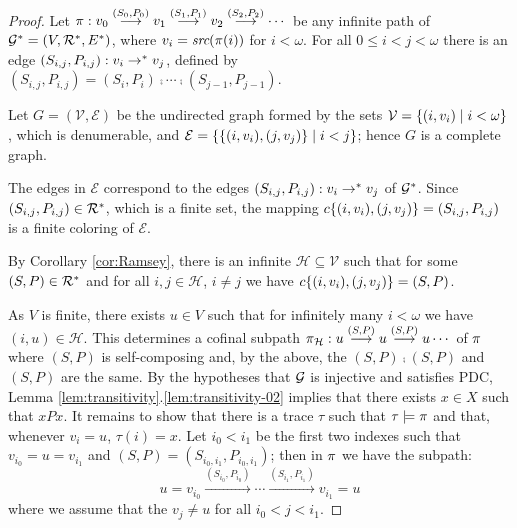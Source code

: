 \begin{proof}
Let $\pi : v_0 \stackrel{(S_0,P_0)}{\longrightarrow} v_1 \stackrel{(S_1,P_1)}{\longrightarrow} v_2 \stackrel{(S_2,P_2)}{\longrightarrow}\cdots$
be any infinite path of $\mathcal{G}^* = (V, \mathcal{R}^*, E^*)$, where $v_i = \textit{src}( \pi(i) )$ for $i < \omega$.
For all $0 \leq i < j < \omega$ there is an edge $(S_{i,j}, P_{i,j}) : v_i \to^* v_j$, 
defined by
$(S_{i,j}, P_{i,j}) = (S_{i}, P_{i}) \comp \cdots \comp (S_{j-1}, P_{j-1})$.

Let $G = (\mathcal{V}, \mathcal{E})$ be the undirected graph formed by the sets
$\mathcal{V} = \{ (i, v_i) \mid i < \omega \}$, which is denumerable, and $\mathcal{E} = \{ \{ (i, v_i), (j, v_j) \} \mid i < j \}$; hence $G$ is a complete graph.

The edges in $\mathcal{E}$ correspond
to the edges $(S_{i,j}, P_{i,j}) : v_i \to^* v_j$ of $\mathcal{G}^*$. 
Since $(S_{i,j}, P_{i,j}) \in \mathcal{R}^*$, which is a finite set, the mapping
$c\{ (i, v_i), (j, v_j) \} = (S_{i,j}, P_{i,j})$ is a finite coloring of $\mathcal{E}$.

By Corollary \ref{cor:Ramsey}, there is an infinite $\mathcal{H} \subseteq \mathcal{V}$ such that for some $(S, P) \in \mathcal{R}^*$ and for all $i, j \in \mathcal{H}$, $i \not  = j$ we have
$c\{ (i, v_i), (j, v_j) \} = (S, P)$. 

As $V$ is finite, there exists $u \in V$ such that for infinitely many $i < \omega$
we have $(i, u) \in \mathcal{H}$.
This determines a cofinal subpath $\pi_{\mathcal{H}} : u \stackrel{(S,P)}{\longrightarrow} u \stackrel{(S,P)}{\longrightarrow} u \cdots$ of $\pi$ where $(S,P)$ is self-composing and, by the above, the  $(S,P)\comp (S,P)$ and $ (S,P)$ are the same.
By the hypotheses that $\mathcal{G}$ is
injective and satisfies PDC, Lemma \ref{lem:transitivity}.\ref{lem:transitivity-02} 
implies that there exists $x \in X$ such that $x P x$.  
It remains to show that there is a trace $\tau$ such that $\tau \models \pi$ and that, whenever $v_i = u$, $\tau(i) = x$.
Let $i_0 < i_1$ be the first two indexes such that $v_{i_0} = u = v_{i_1}$ and $(S,P) = (S_{i_0,i_1},P_{i_0,i_1})$; then in $\pi$ we have the subpath:
\[u = v_{i_0} \stackrel{(S_{i_0},P_{i_0})}{\longrightarrow} \cdots \stackrel{(S_{i_1},P_{i_1})}{\longrightarrow} v_{i_1} = u \]
where we assume that the $v_j \neq u$ for all $i_0 < j < i_1$. 


\end{proof}
